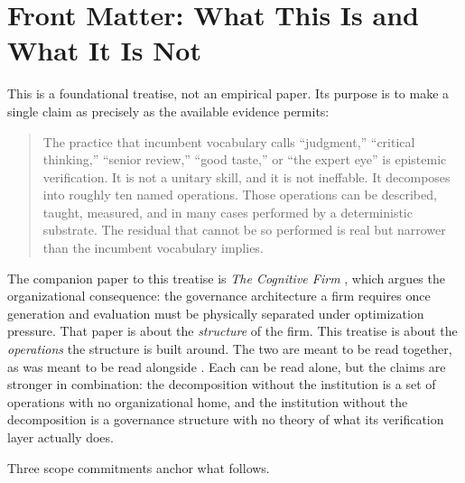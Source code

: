 \documentclass[11pt]{article}
\begin{document}
\tableofcontents
\newpage

\section*{Front Matter: What This Is and What It Is Not}

This is a foundational treatise, not an empirical paper. Its purpose is to make a single claim as precisely as the available evidence permits:

\begin{quote}
The practice that incumbent vocabulary calls ``judgment,'' ``critical thinking,'' ``senior review,'' ``good taste,'' or ``the expert eye'' is epistemic verification. It is not a unitary skill, and it is not ineffable. It decomposes into roughly ten named operations. Those operations can be described, taught, measured, and in many cases performed by a deterministic substrate. The residual that cannot be so performed is real but narrower than the incumbent vocabulary implies.
\end{quote}

The companion paper to this treatise is \emph{The Cognitive Firm} \citep{alami2026b}, which argues the organizational consequence: the governance architecture a firm requires once generation and evaluation must be physically separated under optimization pressure. That paper is about the \emph{structure} of the firm. This treatise is about the \emph{operations} the structure is built around. The two are meant to be read together, as \citet{chandler1977} was meant to be read alongside \citet{williamson1975}. Each can be read alone, but the claims are stronger in combination: the decomposition without the institution is a set of operations with no organizational home, and the institution without the decomposition is a governance structure with no theory of what its verification layer actually does.

Three scope commitments anchor what follows.
\end{document}
